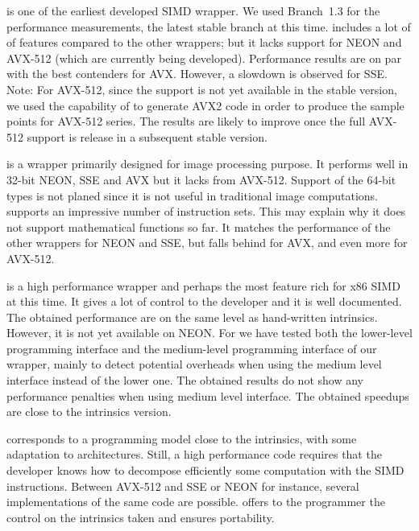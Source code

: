 \textbf{\Vc} is one of the earliest developed SIMD \Cxx wrapper. We used
Branch~1.3 for the performance measurements, the latest stable branch at this
time. \Vc includes a lot of of features compared to the other wrappers; but it
lacks support for NEON and AVX-512 (which are currently being developed).
Performance results are on par with the best contenders for AVX. However, a
slowdown is observed for SSE. Note: For AVX-512, since the support is not yet
available in the stable version, we used the capability of \Vc to generate AVX2
code in order to produce the sample points for AVX-512 series. The results are
likely to improve once the full AVX-512 support is release in a subsequent
stable version.

\textbf{\TSIMD} is a wrapper primarily designed for image processing purpose.
It performs well in 32-bit NEON, SSE and AVX but it lacks from AVX-512. Support
of the 64-bit types is not planed since it is not useful in traditional image
computations. \textbf{\simdpp} supports an impressive number of instruction
sets. This may explain why it does not support mathematical functions so far. It
matches the performance of the other wrappers for NEON and SSE, but falls behind
for AVX, and even more for AVX-512.

\textbf{\VCL} is a high performance wrapper and perhaps the most feature rich
for x86 SIMD at this time. It gives a lot of control to the developer and it is
well documented. The obtained performance are on the same level as hand-written
intrinsics. However, it is not yet available on NEON.
For \MIPP we have tested both the lower-level programming interface and the
medium-level programming interface of our \MIPP wrapper, mainly to detect
potential overheads when using the medium level interface instead of the lower
one. The obtained results do not show any performance penalties when using \MIPP
medium level interface. The obtained speedups are close to the intrinsics
version.

\MIPP corresponds to a programming model close to the intrinsics, with some
adaptation to architectures. Still, a high performance code requires that the
developer knows how to decompose efficiently some computation with the SIMD
instructions. Between AVX-512 and SSE or NEON for instance, several
implementations of the same code are possible. \MIPP offers to the programmer
the control on the intrinsics taken and ensures portability.

